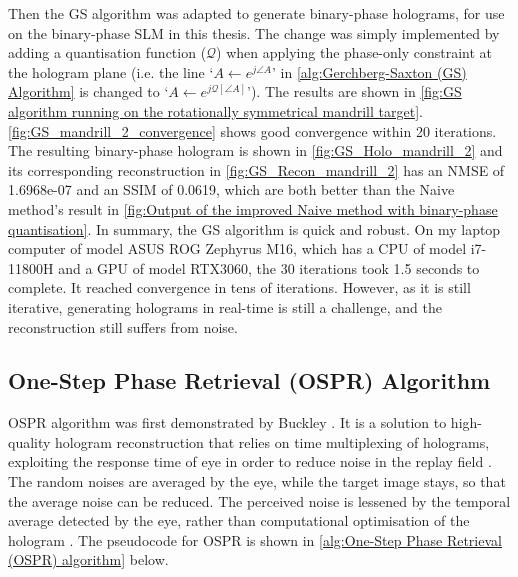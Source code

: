 Then the GS algorithm was adapted to generate binary-phase holograms, for use on the binary-phase SLM in this thesis. The change was simply implemented by adding a quantisation function ($\mathcal{Q}$) when applying the phase-only constraint at the hologram plane (i.e. the line `$A \gets e^{j\angle A}$' in \cref{alg:Gerchberg-Saxton (GS) Algorithm} is changed to `$A \gets e^{j\mathcal{Q}[\angle A]}$'). The results are shown in \cref{fig:GS algorithm running on the rotationally symmetrical mandrill target}. \cref{fig:GS_mandrill_2_convergence} shows good convergence within 20 iterations. The resulting binary-phase hologram is shown in \cref{fig:GS_Holo_mandrill_2} and its corresponding reconstruction in \cref{fig:GS_Recon_mandrill_2} has an NMSE of 1.6968e-07 and an SSIM of 0.0619, which are both better than the Naive method's result in \cref{fig:Output of the improved Naive method with binary-phase quantisation}. In summary, the GS algorithm is quick and robust. On my laptop computer of model ASUS ROG Zephyrus M16, which has a CPU of model i7-11800H and a GPU of model RTX3060, the 30 iterations took 1.5 seconds to complete. It reached convergence in tens of iterations. However, as it is still iterative, generating holograms in real-time is still a challenge, and the reconstruction still suffers from noise.


\subsection{One-Step Phase Retrieval (OSPR) Algorithm}\label{sec:One Step Phase Retrieval (OSPR) Algorithm}
OSPR algorithm was first demonstrated by Buckley \cite{Buckley2006}. It is a solution to high-quality hologram reconstruction that relies on time multiplexing of holograms, exploiting the response time of eye in order to reduce noise in the replay field \cite{Cable2006}. The random noises are averaged by the eye, while the target image stays, so that the average noise can be reduced. The perceived noise is lessened by the temporal average detected by the eye, rather than computational optimisation of the hologram \cite{Cable2006}. The pseudocode for OSPR is shown in \cref{alg:One-Step Phase Retrieval (OSPR) algorithm} below.

